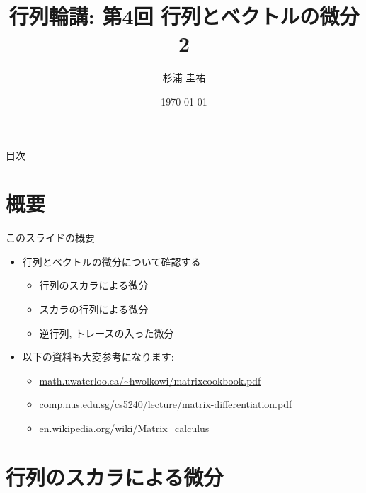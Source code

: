 \documentclass[dvipdfmx,notheorems,t]{beamer}
\title{行列輪講: 第4回 行列とベクトルの微分2}
\author{杉浦 圭祐}
\institute[松谷研究室]{慶應義塾大学理工学部情報工学科 松谷研究室}
\date{\today}
\begin{document}
\linespread{1.1}

\frame{\titlepage}

\section{}

\begin{frame}{目次}
\tableofcontents
\end{frame}

\section{概要}

\begin{frame}{このスライドの概要}
\begin{itemize}
  \item 行列とベクトルの微分について確認する
  \begin{itemize}
    \item 行列のスカラによる微分
    \item スカラの行列による微分
    \item 逆行列, トレースの入った微分
  \end{itemize}
  \item 以下の資料も大変参考になります:
  \begin{itemize}
    \item \url{math.uwaterloo.ca/~hwolkowi/matrixcookbook.pdf}
    \item \url{comp.nus.edu.sg/cs5240/lecture/matrix-differentiation.pdf}
    \item \url{en.wikipedia.org/wiki/Matrix_calculus}
  \end{itemize}
\end{itemize}
\end{frame}

\section{行列のスカラによる微分}
\end{document}
